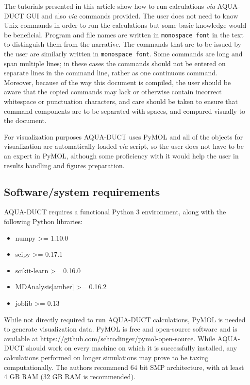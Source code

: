 \documentclass[9pt,tutorial, pubversion]{livecoms}
\begin{document}
The tutorials presented in this article show how to run calculations \textit{via} AQUA-DUCT GUI and also \textit{via} commands provided. The user does not need to know Unix commands in order to run the calculations but some basic knowledge would be beneficial. Program and file names are written in \texttt{monospace font} in the text to distinguish them from the narrative. The commands that are to be issued by the user are similarly written in \texttt{monospace font}. Some commands are long and span multiple lines; in these cases the commands should not be entered on separate lines in the command line, rather as one continuous command. 
Moreover, because of the way this document is compiled, the user should be aware that the copied commands may lack or otherwise contain incorrect whitespace or punctuation characters, and care should be taken to ensure that command components are to be separated with spaces, and compared visually to the document.

For visualization purposes AQUA-DUCT uses PyMOL and all of the objects for visualization are automatically loaded \textit{via} script, so the user does not have to be an expert in PyMOL, although some proficiency with it would help the user in results handling and figures preparation.

\subsection{Software/system requirements}
AQUA-DUCT requires a functional Python 3 environment, along with the following Python libraries:
\begin{itemize}
    \item numpy >= 1.10.0
    \item scipy >= 0.17.1
    \item scikit-learn >= 0.16.0
    \item MDAnalysis[amber] >= 0.16.2
    \item joblib >= 0.13
\end{itemize}
While not directly required to run AQUA-DUCT calculations, PyMOL is needed to generate visualization data.
PyMOL is free and open-source software and is available at \url{https://github.com/schrodinger/pymol-open-source}.
While AQUA-DUCT should work on every machine on which it is successfully installed, any calculations performed on longer simulations may prove to be taxing computationally. The authors recommend 64 bit SMP architecture, with at least 4 GB RAM (32 GB RAM is recommended). 
\end{document}
